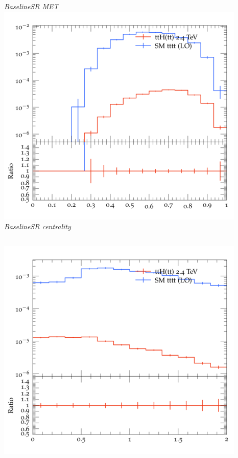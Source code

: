 \documentclass{beamer}
\begin{document}
\begin{frame}
\begin{columns}
\textit{\small BaselineSR MET}
\includegraphics[width=\textwidth]{../plots/ttH_2400/tttt_ttH_1LOS/BaselineSR_centrality.png}\\
\textit{\small BaselineSR centrality}
\end{columns}
\begin{columns}
\includegraphics[width=\textwidth]{../plots/ttH_2400/tttt_ttH_1LOS/BaselineSR_deltaR_bl_min.png}\\

\end{columns}
\end{frame}
\end{document}
